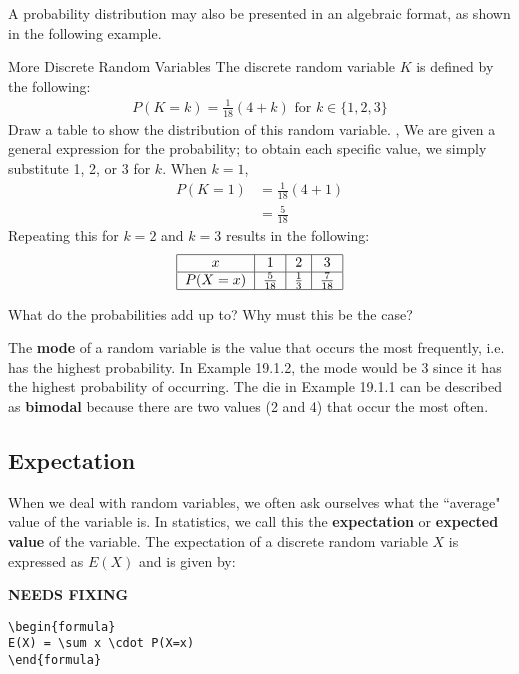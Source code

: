 A probability distribution may also be presented in an algebraic format, as shown in the following example.
\begin{example}{More Discrete Random Variables}
The discrete random variable $K$ is defined by the following:
\begin{align}
P(K=k) = \frac{1}{18}(4+k) \text{ for } k \in \{1, 2, 3\}
\end{align}
Draw a table to show the distribution of this random variable.
\sep
We are given a general expression for the probability; to obtain each specific value, we simply substitute 1, 2, or 3 for $k$. When $k = 1$, 
\begin{align}
P(K=1) &= \frac{1}{18}(4+1) \\ 
&=\frac{5}{18}
\end{align}
Repeating this for $k = 2$ and $k = 3$ results in the following:
\begin{align}
\begin{tabular}{ |c|c|c|c| } 
 \hline
 $x$ & 1 & 2 & 3 \\ 
 \hline
 $P(X=x)$ & $\frac{5}{18}$ & $\frac{1}{3}$ & $\frac{7}{18}$ \\ 
 \hline
\end{tabular}
\end{align}
\subtitle{Insight}
What do the probabilities add up to? Why must this be the case?
\end{example}

The \textbf{mode} of a random variable is the value that occurs the most frequently, i.e. has the highest probability. In Example 19.1.2, the mode would be 3 since it has the highest probability of occurring. The die in Example 19.1.1 can be described as \textbf{bimodal} because there are two values (2 and 4) that occur the most often.

\subsection{Expectation}
When we deal with random variables, we often ask ourselves what the ``average" value of the variable is. In statistics, we call this the \textbf{expectation} or \textbf{expected value} of the variable. The expectation of a discrete random variable $X$ is expressed as $E(X)$ and is given by:

{\hfill\Large\bfseries NEEDS FIXING\hfill}
\begin{lstlisting}
\begin{formula}
E(X) = \sum x \cdot P(X=x)
\end{formula}
 \end{lstlisting}

